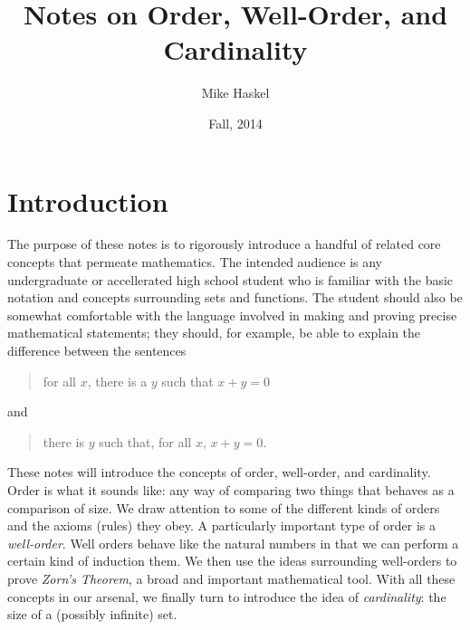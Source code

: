 \documentclass[letterpaper]{article}
\title{Notes on Order, Well-Order, and Cardinality}
\author{Mike Haskel}
\date{Fall, 2014}
\begin{document}
\maketitle

\section{Introduction}
The purpose of these notes is to rigorously introduce a handful of
related core concepts that permeate mathematics.  The intended
audience is any undergraduate or accellerated high school student who
is familiar with the basic notation and concepts surrounding sets and
functions.  The student should also be somewhat comfortable with the
language involved in making and proving precise mathematical
statements; they should, for example, be able to explain the
difference between the sentences
\begin{quote}
  for all $x$, there is a $y$ such that $x+y=0$
\end{quote}
and
\begin{quote}
  there is $y$ such that, for all $x$, $x+y=0$.
\end{quote}

These notes will introduce the concepts of order, well-order, and
cardinality.  Order is what it sounds like: any way of comparing two
things that behaves as a comparison of size.  We draw attention to
some of the different kinds of orders and the axioms (rules) they
obey.  A particularly important type of order is a \emph{well-order}.
Well orders behave like the natural numbers in that we can perform a
certain kind of induction them.  We then use the ideas surrounding
well-orders to prove \emph{Zorn's Theorem}, a broad and important
mathematical tool.  With all these concepts in our arsenal, we finally
turn to introduce the idea of \emph{cardinality}: the size of a
(possibly infinite) set.
\end{document}

